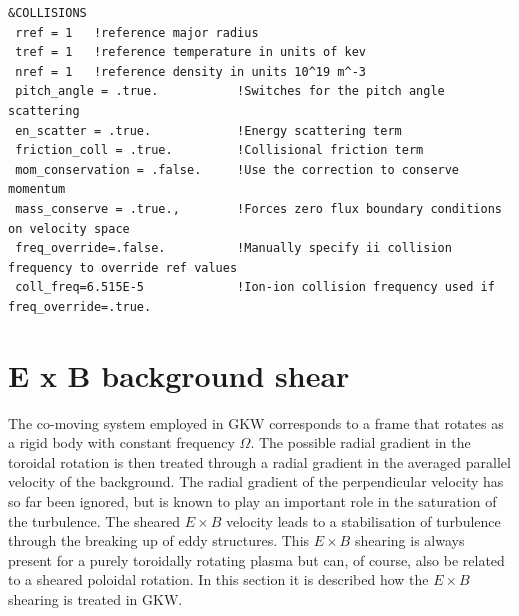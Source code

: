 \documentclass{report}
\begin{document}
\begin{footnotesize}
\begin{verbatim}
&COLLISIONS
 rref = 1   !reference major radius
 tref = 1   !reference temperature in units of kev
 nref = 1   !reference density in units 10^19 m^-3
 pitch_angle = .true.           !Switches for the pitch angle scattering
 en_scatter = .true.            !Energy scattering term 
 friction_coll = .true.         !Collisional friction term
 mom_conservation = .false.     !Use the correction to conserve momentum
 mass_conserve = .true.,        !Forces zero flux boundary conditions on velocity space
 freq_override=.false.          !Manually specify ii collision frequency to override ref values
 coll_freq=6.515E-5             !Ion-ion collision frequency used if freq_override=.true. 
\end{verbatim}\end{footnotesize}



\section{E x B background shear}%

The co-moving system employed in GKW corresponds to a frame that rotates as a rigid body with constant frequency 
$\Omega$. 
The possible radial gradient in the toroidal rotation is then treated through a radial gradient in the averaged parallel velocity 
of the background. 
The radial gradient of the perpendicular velocity has so far been ignored, but is known to play an important role in the 
saturation of the turbulence. 
The sheared $E\times B$ velocity leads to a stabilisation of turbulence through the breaking up of eddy structures. 
This $E\times B$ shearing is always present for a purely toroidally rotating plasma but can, of course, also be related 
to a sheared poloidal rotation. 
In this section it is described how the $E \times B$ shearing is treated in GKW.  
\end{document}
